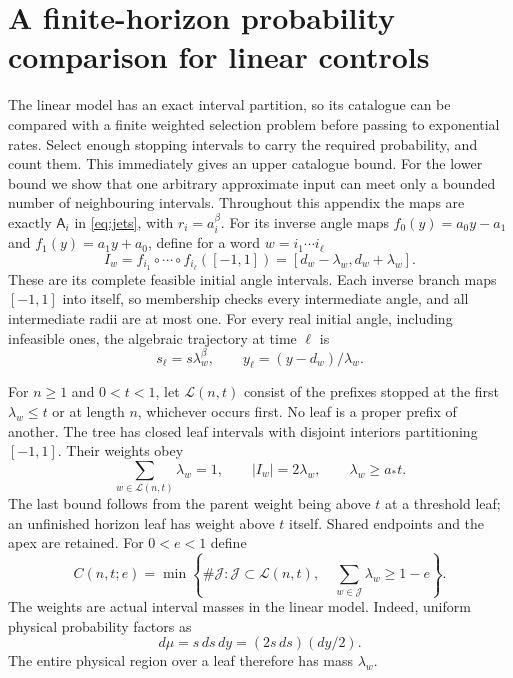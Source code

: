 \documentclass[11pt]{amsart}
\theoremstyle{definition}
\theoremstyle{remark}
\numberwithin{equation}{section}
\begin{document}
\section{A finite-horizon probability comparison for linear controls}
\label{app:linearfinite}
The linear model has an exact interval partition, so its catalogue
can be compared with a finite weighted selection problem before
passing to exponential rates. Select enough stopping intervals to
carry the required probability, and count them. This immediately
gives an upper catalogue bound. For the lower bound we show that
one arbitrary approximate input can meet only a bounded number
of neighbouring intervals. Throughout this appendix the maps are exactly
$\mathsf A_i$ in \eqref{eq:jets}, with $r_i=a_i^\beta$.
For its inverse angle maps $f_0(y)=a_0y-a_1$ and
$f_1(y)=a_1y+a_0$, define for a word $w=i_1\cdots i_\ell$
\[
I_w=f_{i_1}\circ\cdots\circ f_{i_\ell}([-1,1])
      =[d_w-\lambda_w,d_w+\lambda_w].
\]
These are its complete feasible initial angle intervals. Each inverse
branch maps $[-1,1]$ into itself, so membership checks every
intermediate angle, and all intermediate radii are at most one.
For every real initial angle, including infeasible ones, the
algebraic trajectory at time $\ell$ is
\begin{equation}\label{eq:linearleaftrajectory}
s_\ell=s\lambda_w^\beta,\qquad
y_\ell=(y-d_w)/\lambda_w.
\end{equation}

For $n\ge1$ and $0<t<1$, let $\mathcal L(n,t)$ consist of
the prefixes stopped at the first $\lambda_w\le t$ or at length
$n$, whichever occurs first. No leaf is a proper prefix of another. The tree has
closed leaf intervals with disjoint interiors partitioning $[-1,1]$.
Their weights obey
\begin{equation}\label{eq:linearleafweights}
\sum_{w\in\mathcal L(n,t)}\lambda_w=1,
\qquad |I_w|=2\lambda_w,\qquad \lambda_w\ge a_*t.
\end{equation}
The last bound follows from the parent weight being above $t$
at a threshold leaf; an unfinished horizon leaf has weight above
$t$ itself. Shared endpoints and the apex are retained.
For $0<e<1$ define
\begin{equation}\label{eq:weightedcover}
C(n,t;e)=\min\left\{\#\mathcal J:
 \mathcal J\subset\mathcal L(n,t),\quad
 \sum_{w\in\mathcal J}\lambda_w\ge1-e\right\}.
\end{equation}
The weights are actual interval masses in the linear model.
Indeed, uniform physical probability factors as
\begin{equation}\label{eq:linearfactorprob}
d\mu=s\,ds\,dy=(2s\,ds)(dy/2).
\end{equation}
The entire physical region over a leaf therefore has mass $\lambda_w$.
\end{document}
